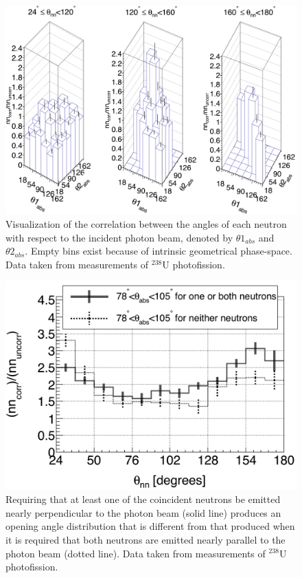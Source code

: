 \begin{figure}
    \includegraphics[width = \figsize\textwidth]{theta_abs_LEGO.png}
    \caption{Visualization of the correlation between the angles of each neutron with respect to the incident photon beam, denoted by $\theta 1_{abs}$ and $\theta 2_{abs}$.
    Empty bins exist because of intrinsic geometrical phase-space.
    Data taken from measurements of $^{238}$U photofission.}
    \label{fig:theta_abs_LEGO}
\end{figure}

\begin{figure}
\includegraphics[width=\figsize\textwidth]{theta_abs_two-neutron.png}
\caption{Requiring that at least one of the coincident neutrons be emitted nearly perpendicular to the photon beam (solid line) produces an opening angle distribution that is different from that produced when it is required that both neutrons are emitted nearly parallel to the photon beam (dotted line).
Data taken from measurements of $^{238}$U photofission.}
\label{fig:theta_abs_two_neutron}
\end{figure}